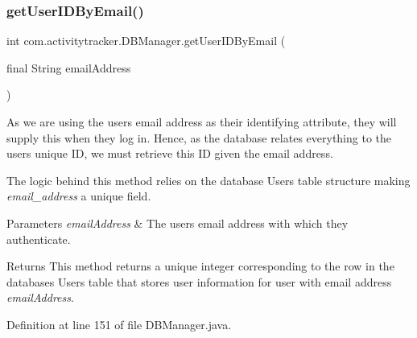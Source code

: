\subsubsection{\texorpdfstring{getUserIDByEmail()}{getUserIDByEmail()}}
{\footnotesize\ttfamily int com.\+activitytracker.\+D\+B\+Manager.\+get\+User\+I\+D\+By\+Email (\begin{DoxyParamCaption}\item[{final String}]{email\+Address }\end{DoxyParamCaption})}

As we are using the user\textquotesingle{}s email address as their identifying attribute, they will supply this when they log in. Hence, as the database relates everything to the user\textquotesingle{}s unique ID, we must retrieve this ID given the email address.

The logic behind this method relies on the database Users table structure making {\itshape email\+\_\+address} a unique field.


\begin{DoxyParams}{Parameters}
{\em email\+Address} & The user\textquotesingle{}s email address with which they authenticate.\\
\hline
\end{DoxyParams}
\begin{DoxyReturn}{Returns}
This method returns a unique integer corresponding to the row in the database\textquotesingle{}s Users table that stores user information for user with email address {\itshape email\+Address}. 
\end{DoxyReturn}


Definition at line 151 of file D\+B\+Manager.\+java.


